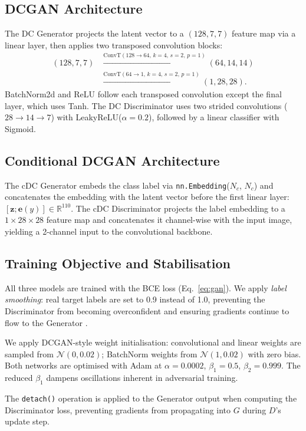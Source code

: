 \documentclass[conference]{IEEEtran}
\begin{document}
\subsection{DCGAN Architecture}
The DC Generator projects the latent vector to a $(128, 7, 7)$ feature map via a linear layer, then applies two transposed convolution blocks:
\begin{align*}
(128,7,7) &\xrightarrow{\text{ConvT}(128\to64,\,k=4,\,s=2,\,p=1)} (64,14,14) \\
           &\xrightarrow{\text{ConvT}(64\to1,\,k=4,\,s=2,\,p=1)} (1,28,28).
\end{align*}
BatchNorm2d and ReLU follow each transposed convolution except the final layer, which uses Tanh. The DC Discriminator uses two strided convolutions ($28\to14\to7$) with LeakyReLU($\alpha=0.2$), followed by a linear classifier with Sigmoid.

\subsection{Conditional DCGAN Architecture}
The cDC Generator embeds the class label via \texttt{nn.Embedding}($N_c$, $N_c$) and concatenates the embedding with the latent vector before the first linear layer: $[\mathbf{z}; \mathbf{e}(y)] \in \mathbb{R}^{110}$. The cDC Discriminator projects the label embedding to a $1\times28\times28$ feature map and concatenates it channel-wise with the input image, yielding a 2-channel input to the convolutional backbone.

\subsection{Training Objective and Stabilisation}
All three models are trained with the BCE loss (Eq.~\ref{eq:gan}). We apply \emph{label smoothing}: real target labels are set to 0.9 instead of 1.0, preventing the Discriminator from becoming overconfident and ensuring gradients continue to flow to the Generator \cite{salimans2016improved}.

We apply DCGAN-style weight initialisation: convolutional and linear weights are sampled from $\mathcal{N}(0, 0.02)$; BatchNorm weights from $\mathcal{N}(1, 0.02)$ with zero bias. Both networks are optimised with Adam \cite{kingma2015adam} at $\alpha = 0.0002$, $\beta_1=0.5$, $\beta_2=0.999$. The reduced $\beta_1$ dampens oscillations inherent in adversarial training.

The \texttt{detach()} operation is applied to the Generator output when computing the Discriminator loss, preventing gradients from propagating into $G$ during $D$'s update step.
\end{document}

